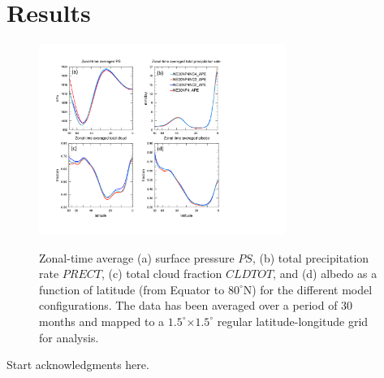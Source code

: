 \documentclass[twocol]{ametsoc}
\begin{document}
\section{Results}
\begin{figure}[t]
\noindent\includegraphics[width=19pc,angle=0]{figs/zonal_time_avg_2d_fields.pdf}\\
\caption{Zonal-time average (a) surface pressure $PS$, (b) total precipitation rate $PRECT$, (c) total cloud fraction $CLDTOT$, and (d) albedo as a function of latitude (from Equator to $80^\circ$N) for the different model configurations. The data has been averaged over a period of 30 months and mapped to a $1.5^\circ$$\times$$1.5^\circ$ regular latitude-longitude grid for analysis.}
\end{figure}




%
\acknowledgments
Start acknowledgments here.
\end{document}
